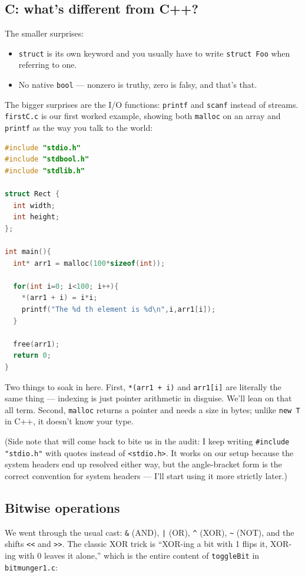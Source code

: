 \documentclass[11pt]{article}
\begin{document}
\subsection*{C: what's different from C++?}

The smaller surprises:
\begin{itemize}
  \item \texttt{struct} is its own keyword and you usually have to
    write \texttt{struct Foo} when referring to one.
  \item No native \texttt{bool} --- nonzero is truthy, zero is falsy,
    and that's that.
\end{itemize}
The bigger surprises are the I/O functions: \texttt{printf} and
\texttt{scanf} instead of streams. \texttt{firstC.c} is our first
worked example, showing both \texttt{malloc} on an array and
\texttt{printf} as the way you talk to the world:

\begin{lstlisting}[language=C]
#include "stdio.h"
#include "stdbool.h"
#include "stdlib.h"

struct Rect {
  int width;
  int height;
};

int main(){
  int* arr1 = malloc(100*sizeof(int));

  for(int i=0; i<100; i++){
    *(arr1 + i) = i*i;
    printf("The %d th element is %d\n",i,arr1[i]);
  }

  free(arr1);
  return 0;
}
\end{lstlisting}

Two things to soak in here. First, \texttt{*(arr1 + i)} and
\texttt{arr1[i]} are literally the same thing --- indexing is just
pointer arithmetic in disguise. We'll lean on that all term. Second,
\texttt{malloc} returns a pointer and needs a size in bytes; unlike
\texttt{new T} in C++, it doesn't know your type.

(Side note that will come back to bite us in the audit: I keep
writing \texttt{\#include "stdio.h"} with quotes instead of
\texttt{<stdio.h>}. It works on our setup because the system headers
end up resolved either way, but the angle-bracket form is the
correct convention for system headers --- I'll start using it more
strictly later.)

\subsection*{Bitwise operations}

We went through the usual cast: \texttt{\&} (AND), \texttt{|} (OR),
\texttt{\^{}} (XOR), \texttt{\textasciitilde{}} (NOT), and the
shifts \texttt{<<} and \texttt{>>}. The classic XOR trick is
``XOR-ing a bit with 1 flips it, XOR-ing with 0 leaves it alone,''
which is the entire content of \texttt{toggleBit} in
\texttt{bitmunger1.c}:
\end{document}

